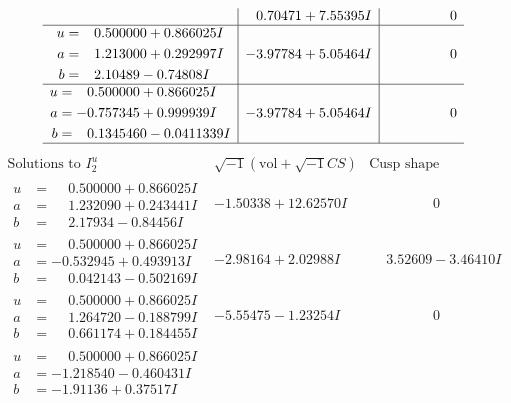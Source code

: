 \documentclass[1p]{elsarticle_modified}
\theoremstyle{definition}
\newcommand{\I}{\sqrt{-1}}
\begin{document}
$$\begin{array}{c|c|c}
 & \phantom{-}0.70471 + 7.55395 I & \phantom{-0.000000 } 0 \\ \hline\begin{aligned}
u &= \phantom{-}0.500000 + 0.866025 I \\
a &= \phantom{-}1.213000 + 0.292997 I \\
b &= \phantom{-}2.10489 - 0.74808 I\end{aligned}
 & -3.97784 + 5.05464 I & \phantom{-0.000000 } 0 \\ \hline\begin{aligned}
u &= \phantom{-}0.500000 + 0.866025 I \\
a &= -0.757345 + 0.999939 I \\
b &= \phantom{-}0.1345460 - 0.0411339 I\end{aligned}
 & -3.97784 + 5.05464 I & \phantom{-0.000000 } 0\\
 \hline 
 \end{array}$$\newpage$$\begin{array}{c|c|c}  
\text{Solutions to }I^u_{2}& \I (\text{vol} + \sqrt{-1}CS) & \text{Cusp shape}\\
 \hline 
\begin{aligned}
u &= \phantom{-}0.500000 + 0.866025 I \\
a &= \phantom{-}1.232090 + 0.243441 I \\
b &= \phantom{-}2.17934 - 0.84456 I\end{aligned}
 & -1.50338 + 12.62570 I & \phantom{-0.000000 } 0 \\ \hline\begin{aligned}
u &= \phantom{-}0.500000 + 0.866025 I \\
a &= -0.532945 + 0.493913 I \\
b &= \phantom{-}0.042143 - 0.502169 I\end{aligned}
 & -2.98164 + 2.02988 I & \phantom{-}3.52609 - 3.46410 I \\ \hline\begin{aligned}
u &= \phantom{-}0.500000 + 0.866025 I \\
a &= \phantom{-}1.264720 - 0.188799 I \\
b &= \phantom{-}0.661174 + 0.184455 I\end{aligned}
 & -5.55475 - 1.23254 I & \phantom{-0.000000 } 0 \\ \hline\begin{aligned}
u &= \phantom{-}0.500000 + 0.866025 I \\
a &= -1.218540 - 0.460431 I \\
b &= -1.91136 + 0.37517 I\end{aligned}

\end{array}$$
\end{document}
